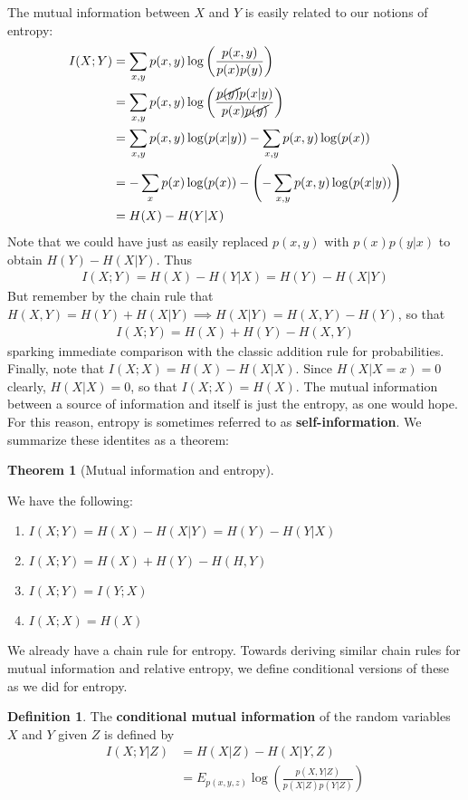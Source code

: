 \documentclass{article}
\theoremstyle{definition}
\newtheorem{definition}{Definition}[section]
\theoremstyle{plain}
\newtheorem{theorem}{Theorem}[section]
\begin{document}
The mutual information between $X$ and $Y$ is easily related to our notions of entropy:
\begin{align}
	I(X;Y) &= \sum_{x,y} p(x,y) \log\left( \frac{p(x,y)}{p(x)p(y)}\right) \\
		   &= \sum_{x,y} p(x,y) \log\left( \frac{ \cancel{p(y)} p(x|y)}{p(x)\cancel{p(y)}} \right) \\
		   &=  \sum_{x,y}p(x,y)\log(p(x|y)) - \sum_{x,y} p(x,y)\log(p(x)) \\
		   &= - \sum_x p(x)\log(p(x)) - \left( - \sum_{x,y}p(x,y)\log(p(x|y)) \right) \\
		   &= H(X) - H(Y|X)
\end{align}
Note that we could have just as easily replaced $p(x,y)$ with $p(x)p(y|x)$ to obtain $H(Y) - H(X|Y)$. Thus 
\begin{align}
	I(X;Y) = H(X) -H(Y|X) = H(Y)-H(X|Y)
\end{align}
But remember by the chain rule that $H(X,Y) = H(Y) + H(X|Y) \implies H(X|Y) = H(X,Y) - H(Y)$, so that 
\begin{align}
	I(X;Y) = H(X)+H(Y)-H(X,Y)
\end{align}
sparking immediate comparison with the classic addition rule for probabilities. 
Finally, note that $I(X;X) = H(X) - H(X|X)$. Since $H(X|X = x) = 0$ clearly, $H(X|X) = 0$, so that $I(X;X) = H(X)$. The mutual information between a source of information and itself is just the entropy, as one would hope. For this reason, entropy is sometimes referred to as \textbf{self-information}. We summarize these identites as a theorem:
\begin{theorem}[Mutual information and entropy]
\end{theorem}
We have the following:
\begin{enumerate}
	\item[(1)] $I(X;Y) = H(X) - H(X|Y) = H(Y)-H(Y|X)$ 
	\item[(2)] $I(X;Y) = H(X) + H(Y) - H(H,Y)$ 
	\item[(3)] $I(X;Y) = I(Y;X)$ 
	\item[(4)] $I(X;X) = H(X)$
\end{enumerate}
We already have a chain rule for entropy. Towards deriving similar chain rules for mutual information and relative entropy, we define conditional versions of these as we did for entropy. 
\begin{definition}
	The \textbf{conditional mutual information} of the random variables $X$ and $Y$ given $Z$ is defined by 
	\begin{align}
		I(X;Y|Z) &= H(X|Z) - H(X|Y,Z) \\
			&= E_{p(x,y,z)} \log\left( \frac{p(X,Y|Z)}{p(X|Z)p(Y|Z)} \right)
	\end{align}
\end{definition}
\end{document}

